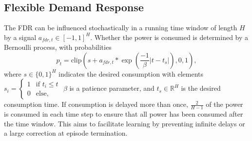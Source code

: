 \subsection{Flexible Demand Response}
The FDR can be influenced stochastically in a running time window of length $H$ by a signal $a_{fdr, t} \in [-1 , 1]^H$. Whether the power is consumed is determined by a Bernoulli process, with probabilities
\begin{equation}
    p_t = \text{clip}\left(s + a_{fdr, t} * \exp\left(\frac{-1}{\beta}\left|t - t_{s}\right|\right), 0, 1\right),
\end{equation}
where $s \in \{0,1\}^{H}$ indicates the desired consumption with elements $s_i = \begin{cases}
    1 & \text{if } t_i \leq t \\
    0 & \text{else},
\end{cases}$ $\beta$ is a patience parameter, and $t_{s} \in \mathbb{R}^{H}$ is the desired consumption time. If consumption is delayed more than once, $\frac{2}{H-1}$ of the power is consumed in each time step to ensure that all power has been consumed after the time window. This aims to facilitate learning by preventing infinite delays or a large correction at episode termination.

